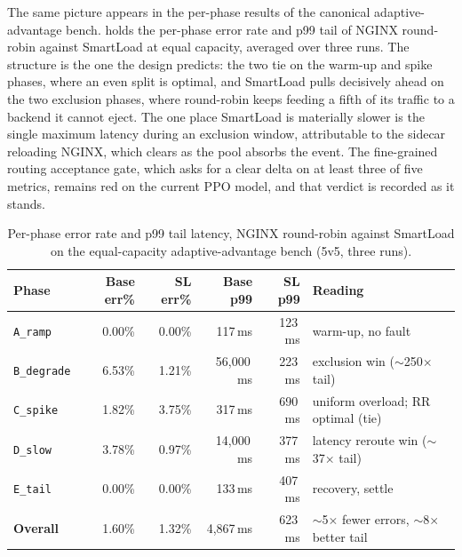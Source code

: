 The same picture appears in the per-phase results of the canonical adaptive-advantage
bench.  holds the per-phase error rate and p99 tail of NGINX
round-robin against SmartLoad at equal capacity, averaged over three runs. The structure
is the one the design predicts: the two tie on the warm-up and spike phases, where an
even split is optimal, and SmartLoad pulls decisively ahead on the two exclusion phases,
where round-robin keeps feeding a fifth of its traffic to a backend it cannot eject. The
one place SmartLoad is materially slower is the single maximum latency during an
exclusion window, attributable to the sidecar reloading NGINX, which clears as the
pool absorbs the event. The
fine-grained routing acceptance gate, which asks for a clear delta on at least three of
five metrics, remains red on the current PPO model, and that verdict is recorded as it
stands.

\begin{table}[H]
  \centering
  \caption[Per-phase results, round-robin against SmartLoad at equal capacity]{Per-phase error rate and p99 tail latency, NGINX round-robin against SmartLoad on the equal-capacity adaptive-advantage bench (5v5, three runs).}
  \label{tab:disc:perphase}
  \small
  \begin{tabular}{@{}lrrrrl@{}}
    \toprule
    \headrow
    \textbf{Phase} & \textbf{Base err\%} & \textbf{SL err\%} & \textbf{Base p99} & \textbf{SL p99} & \textbf{Reading} \\
    \midrule
    \texttt{A\_ramp}    & 0.00\% & 0.00\% & 117\,ms     & 123\,ms & warm-up, no fault \\
    \texttt{B\_degrade} & 6.53\% & 1.21\% & 56{,}000\,ms & 223\,ms & exclusion win ($\sim$250$\times$ tail) \\
    \texttt{C\_spike}   & 1.82\% & 3.75\% & 317\,ms     & 690\,ms & uniform overload; RR optimal (tie) \\
    \texttt{D\_slow}    & 3.78\% & 0.97\% & 14{,}000\,ms & 377\,ms & latency reroute win ($\sim$37$\times$ tail) \\
    \texttt{E\_tail}    & 0.00\% & 0.00\% & 133\,ms     & 407\,ms & recovery, settle \\
    \midrule
    \textbf{Overall}    & 1.60\% & 1.32\% & 4{,}867\,ms & 623\,ms & $\sim$5$\times$ fewer errors, $\sim$8$\times$ better tail \\
    \bottomrule
  \end{tabular}
\end{table}


